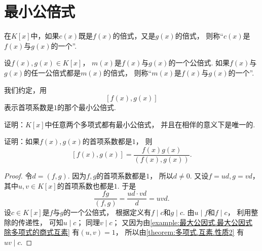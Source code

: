 \section{最小公倍式}
\begin{definition}
在\(K[x]\)中，如果\(c(x)\)既是\(f(x)\)的倍式，又是\(g(x)\)的倍式，
则称“\(c(x)\)是\(f(x)\)与\(g(x)\)的一个”.
\end{definition}

\begin{definition}
设\(f(x),g(x) \in K[x]\)，
\(m(x)\)是\(f(x)\)与\(g(x)\)的一个公倍式.
如果\(f(x)\)与\(g(x)\)的任一公倍式都是\(m(x)\)的倍式，
则称“\(m(x)\)是\(f(x)\)与\(g(x)\)的一个”.
\end{definition}

我们约定，用\[
	[f(x), g(x)]
\]表示首项系数是\(1\)的那个最小公倍式.

\begin{example}
证明：\(K[x]\)中任意两个多项式都有最小公倍式，
并且在相伴的意义下是唯一的.
\end{example}

\begin{example}
证明：如果\(f(x),g(x)\)的首项系数都是\(1\)，
则\[
	[f(x),g(x)]
	= \frac{f(x) g(x)}{(f(x),g(x))}.
\]
\begin{proof}
令\(d=(f,g)\).
因为\(f,g\)的首项系数都是\(1\)，
所以\(d\neq0\).
又设\(f=ud,g=vd\)，
其中\(u,v \in K[x]\)的首项系数也都是\(1\).
于是\[
	\frac{fg}{(f,g)}
	= \frac{ud \cdot vd}{d}
	= uvd.
\]
设\(c \in K[x]\)是\(f\)与\(g\)的一个公倍式，
根据定义有\(f \mid c\)和\(g \mid c\).
由\(u \mid f\)和\(f\mid c\)，
利用整除的传递性，
可知\(u \mid c\)；
同理\(v \mid c\)；
又因为由\cref{example:最大公因式.最大公因式除多项式的商式互素}
有\((u,v)=1\)，
所以由\cref{theorem:多项式.互素.性质2}
有\(uv \mid c\).
\end{proof}
\end{example}
